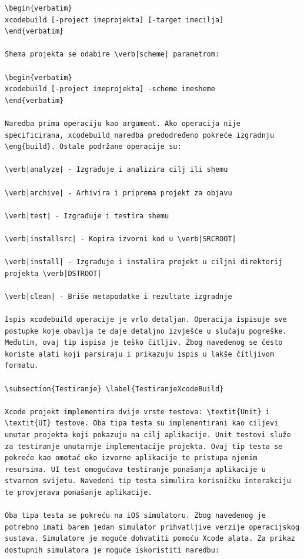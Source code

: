 \documentclass[times, utf8, diplomski, numeric]{fer}
\newcommand{\eng}[1]{(engl. \textit{#1})}
\begin{document}
\begin{appendices}
\begin{lstlisting}[caption=Provjera postojanja i pokretanje Swiftlint alata, label=listing:swiftlint]
\begin{verbatim}
xcodebuild [-project imeprojekta] [-target imecilja]
\end{verbatim}

Shema projekta se odabire \verb|scheme| parametrom:

\begin{verbatim}
xcodebuild [-project imeprojekta] -scheme imesheme
\end{verbatim}

Naredba prima operaciju kao argument. Ako operacija nije specificirana, xcodebuild naredba predodređeno pokreće izgradnju \eng{build}. Ostale podržane operacije su:

\verb|analyze| - Izgrađuje i analizira cilj ili shemu

\verb|archive| - Arhivira i priprema projekt za objavu

\verb|test| - Izgrađuje i testira shemu

\verb|installsrc| - Kopira izvorni kod u \verb|SRCROOT|

\verb|install| - Izgrađuje i instalira projekt u ciljni direktorij projekta \verb|DSTROOT|

\verb|clean| - Briše metapodatke i rezultate izgradnje

Ispis xcodebuild operacije je vrlo detaljan. Operacija ispisuje sve postupke koje obavlja te daje detaljno izvješće u slučaju pogreške. Međutim, ovaj tip ispisa je teško čitljiv. Zbog navedenog se često koriste alati koji parsiraju i prikazuju ispis u lakše čitljivom formatu.

\subsection{Testiranje} \label{TestiranjeXcodeBuild}

Xcode projekt implementira dvije vrste testova: \textit{Unit} i \textit{UI} testove. Oba tipa testa su implementirani kao ciljevi unutar projekta koji pokazuju na cilj aplikacije. Unit testovi služe za testiranje unutarnje implementacije projekta. Ovaj tip testa se pokreće kao omotač oko izvorne aplikacije te pristupa njenim resursima. UI test omogućava testiranje ponašanja aplikacije u stvarnom svijetu. Navedeni tip testa simulira korisničku interakciju te provjerava ponašanje aplikacije.

Oba tipa testa se pokreću na iOS simulatoru. Zbog navedenog je potrebno imati barem jedan simulator prihvatljive verzije operacijskog sustava. Simulatore je moguće dohvatiti pomoću Xcode alata. Za prikaz dostupnih simulatora je moguće iskoristiti naredbu:


\end{lstlisting}
\end{appendices}
\end{document}
